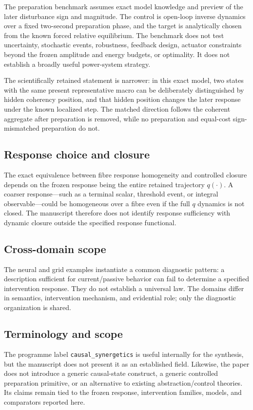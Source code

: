 The preparation benchmark assumes exact model knowledge and preview of the later disturbance sign and magnitude. The control is open-loop inverse dynamics over a fixed two-second preparation phase, and the target is analytically chosen from the known forced relative equilibrium. The benchmark does not test uncertainty, stochastic events, robustness, feedback design, actuator constraints beyond the frozen amplitude and energy budgets, or optimality. It does not establish a broadly useful power-system strategy.

The scientifically retained statement is narrower: in this exact model, two states with the same present representative macro can be deliberately distinguished by hidden coherency position, and that hidden position changes the later response under the known localized step. The matched direction follows the coherent aggregate after preparation is removed, while no preparation and equal-cost sign-mismatched preparation do not.

\subsection{Response choice and closure}

The exact equivalence between fibre response homogeneity and controlled closure depends on the frozen response being the entire retained trajectory $q(\cdot)$. A coarser response---such as a terminal scalar, threshold event, or integral observable---could be homogeneous over a fibre even if the full $q$ dynamics is not closed. The manuscript therefore does not identify response sufficiency with dynamic closure outside the specified response functional.

\subsection{Cross-domain scope}

The neural and grid examples instantiate a common diagnostic pattern: a description sufficient for current/passive behavior can fail to determine a specified intervention response. They do not establish a universal law. The domains differ in semantics, intervention mechanism, and evidential role; only the diagnostic organization is shared.

\subsection{Terminology and scope}

The programme label \texttt{causal\_synergetics} is useful internally for the synthesis, but the manuscript does not present it as an established field. Likewise, the paper does not introduce a generic causal-state construct, a generic controlled preparation primitive, or an alternative to existing abstraction/control theories. Its claims remain tied to the frozen response, intervention families, models, and comparators reported here.

